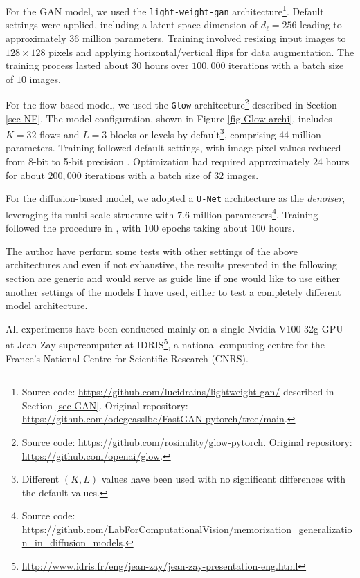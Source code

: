 \documentclass[fleqn,usenatbib]{mnras}
\begin{document}
For the GAN model, we used the \texttt{light-weight-gan} architecture\footnote{Source code: \url{https://github.com/lucidrains/lightweight-gan/} described in Section \ref{sec-GAN}. Original repository: \url{https://github.com/odegeasslbc/FastGAN-pytorch/tree/main}.}. Default settings were applied, including a latent space dimension of $d_\ell=256$ leading to approximately $36$ million parameters. Training involved resizing input images to $128 \times 128$ pixels and applying horizontal/vertical flips for data augmentation. The training process lasted about $30$ hours over $100,000$ iterations with a batch size of $10$ images.

For the flow-based model, we used the \texttt{Glow} architecture\footnote{Source code: \url{https://github.com/rosinality/glow-pytorch}. Original repository: \url{https://github.com/openai/glow}.} described in Section \ref{sec-NF}. The model configuration, shown in Figure \ref{fig-Glow-archi}, includes $K=32$ flows and $L=3$ blocks or levels by default\footnote{Different $(K,L)$ values have been used with no significant differences with the default values.}, comprising $44$ million parameters. Training followed default settings, with image pixel values reduced from 8-bit to 5-bit precision \citep{Kingma2018}. Optimization had required approximately $24$ hours for about $200,000$ iterations with a batch size of $32$ images.

For the diffusion-based model, we adopted a \texttt{U-Net} architecture \citep{ronneberger2015u} as the \textit{denoiser}, leveraging its multi-scale structure with $7.6$ million parameters\footnote{Source code: \url{https://github.com/LabForComputationalVision/memorization_generalization_in_diffusion_models}.}. Training followed the procedure in \cite{kadkhodaie2024generalization}, with $100$ epochs taking about $100$ hours.

{\color{red}The author have perform some tests with other settings of the above architectures and even if not exhaustive, the results presented in the following section are generic and would serve as guide line if one would like to use either another settings of the models I have used, either to test a completely different model architecture.

All experiments have been conducted mainly on a single Nvidia V100-32g GPU at Jean Zay supercomputer at IDRIS\footnote{\url{http://www.idris.fr/eng/jean-zay/jean-zay-presentation-eng.html}}, a national computing centre for the France's National Centre for Scientific Research (CNRS).
}
\end{document}
